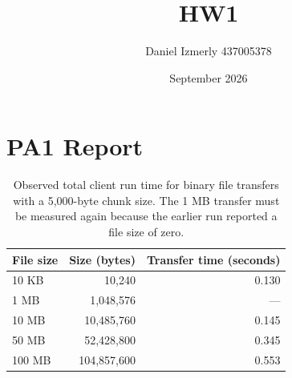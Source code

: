 \documentclass{article}
\title{HW1}
\author{Daniel Izmerly 437005378}
\date{September 2026}
\begin{document}
\maketitle

\section{PA1 Report}

\begin{table}[h]
\centering
\begin{tabular}{lrr}
\hline
File size & Size (bytes) & Transfer time (seconds) \\
\hline
10 KB  & 10,240      & 0.130 \\
1 MB   & 1,048,576   & --- \\
10 MB  & 10,485,760  & 0.145 \\
50 MB  & 52,428,800  & 0.345 \\
100 MB & 104,857,600 & 0.553 \\
\hline
\end{tabular}
\caption{Observed total client run time for binary file transfers with a 5,000-byte chunk size. The 1 MB transfer must be measured again because the earlier run reported a file size of zero.}
\end{table}
\end{document}
